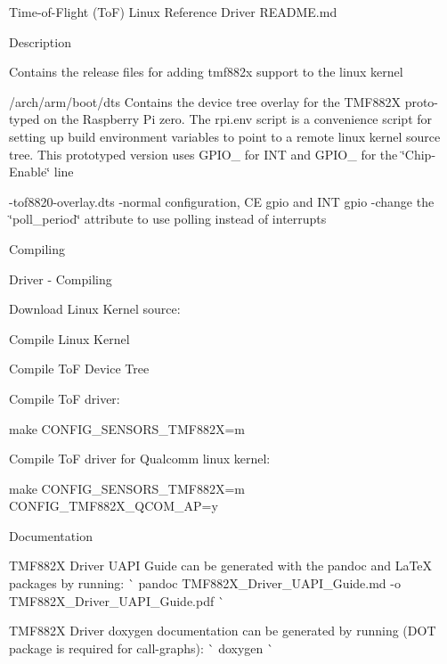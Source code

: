 Time-\/of-\/\+Flight (ToF) Linux Reference Driver README.\+md

\doxysubparagraph*{}


\begin{DoxyEnumerate}
\item Description

Contains the release files for adding tmf882x support to the linux kernel

/arch/arm/boot/dts Contains the device tree overlay for the TMF882X proto-\/ typed on the Raspberry Pi zero. The rpi.\+env script is a convenience script for setting up build environment variables to point to a remote linux kernel source tree. This prototyped version uses GPIO\+\_ for INT and GPIO\+\_ for the \char`\"{}\+Chip-\/\+Enable\char`\"{} line

-\/tof8820-\/overlay.\+dts -\/normal configuration, CE gpio and INT gpio -\/change the \char`\"{}poll\+\_\+period\char`\"{} attribute to use polling instead of interrupts
\item Compiling

Driver -\/ Compiling
\begin{DoxyEnumerate}
\item Download Linux Kernel source\+:
\item Compile Linux Kernel
\item Compile ToF Device Tree
\item Compile ToF driver\+:
\begin{DoxyItemize}
\item \textquotesingle{}make CONFIG\+\_\+\+SENSORS\+\_\+\+TMF882X=m\textquotesingle{}
\end{DoxyItemize}
\item Compile ToF driver for Qualcomm linux kernel\+:
\begin{DoxyItemize}
\item \textquotesingle{}make CONFIG\+\_\+\+SENSORS\+\_\+\+TMF882X=m CONFIG\+\_\+\+TMF882\+X\+\_\+\+QCOM\+\_\+\+AP=y\textquotesingle{}
\end{DoxyItemize}
\end{DoxyEnumerate}
\item Documentation

TMF882X Driver UAPI Guide can be generated with the \textquotesingle{}pandoc\textquotesingle{} and \textquotesingle{}La\+TeX\textquotesingle{} packages by running\+: \`{} pandoc TMF882\+X\+\_\+\+Driver\+\_\+\+UAPI\+\_\+\+Guide.\+md -\/o TMF882\+X\+\_\+\+Driver\+\_\+\+UAPI\+\_\+\+Guide.\+pdf \`{}

TMF882X Driver doxygen documentation can be generated by running (\textquotesingle{}DOT\textquotesingle{} package is required for call-\/graphs)\+: \`{} doxygen \`{} 
\end{DoxyEnumerate}